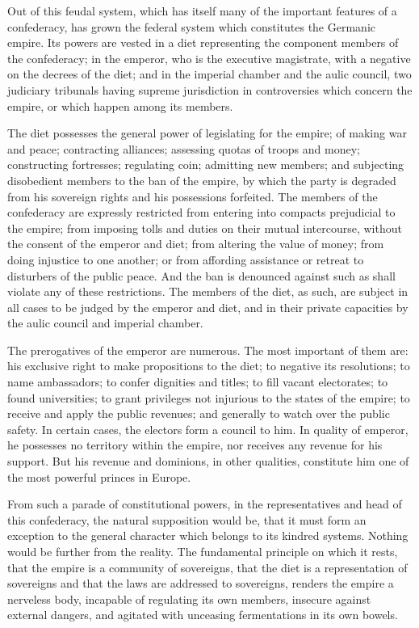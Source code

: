 Out of this feudal system, which has itself many of the important features of a confederacy, has grown the federal system which constitutes the Germanic empire. 
Its powers are vested in a diet representing the component members of the confederacy; in the emperor, who is the executive magistrate, with a negative on the decrees of the diet; and in the imperial chamber and the aulic council, two judiciary tribunals having supreme jurisdiction in controversies which concern the empire, or which happen among its members.

The diet possesses the general power of legislating for the empire; of making war and peace; contracting alliances; assessing quotas of troops and money; constructing fortresses; regulating coin; admitting new members; and subjecting disobedient members to the ban of the empire, by which the party is degraded from his sovereign rights and his possessions forfeited. 
The members of the confederacy are expressly restricted from entering into compacts prejudicial to the empire; from imposing tolls and duties on their mutual intercourse, without the consent of the emperor and diet; from altering the value of money; from doing injustice to one another; or from affording assistance or retreat to disturbers of the public peace. 
And the ban is denounced against such as shall violate any of these restrictions. 
The members of the diet, as such, are subject in all cases to be judged by the emperor and diet, and in their private capacities by the aulic council and imperial chamber.

The prerogatives of the emperor are numerous. 
The most important of them are: his exclusive right to make propositions to the diet; to negative its resolutions; to name ambassadors; to confer dignities and titles; to fill vacant electorates; to found universities; to grant privileges not injurious to the states of the empire; to receive and apply the public revenues; and generally to watch over the public safety. 
In certain cases, the electors form a council to him. 
In quality of emperor, he possesses no territory within the empire, nor receives any revenue for his support. 
But his revenue and dominions, in other qualities, constitute him one of the most powerful princes in Europe.

From such a parade of constitutional powers, in the representatives and head of this confederacy, the natural supposition would be, that it must form an exception to the general character which belongs to its kindred systems. 
Nothing would be further from the reality. 
The fundamental principle on which it rests, that the empire is a community of sovereigns, that the diet is a representation of sovereigns and that the laws are addressed to sovereigns, renders the empire a nerveless body, incapable of regulating its own members, insecure against external dangers, and agitated with unceasing fermentations in its own bowels.

